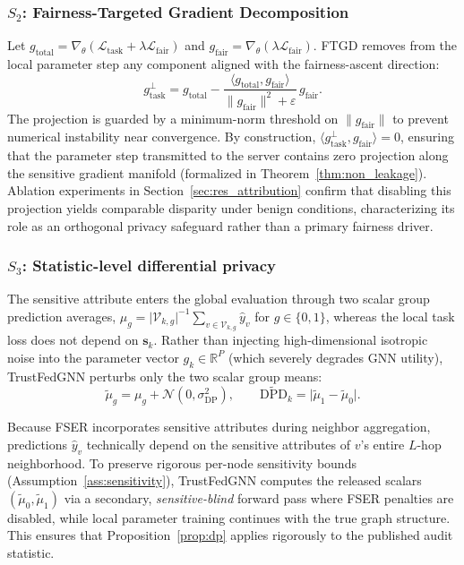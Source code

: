 \documentclass[preprint,12pt]{elsarticle}
\theoremstyle{plain}
\theoremstyle{definition}
\theoremstyle{remark}
\newcommand{\dpd}{\mathrm{DPD}}
\newcommand{\R}{\mathbb{R}}
\begin{document}
\subsubsection{\texorpdfstring{$S_2$:}{S2:} Fairness-Targeted Gradient Decomposition}
Let $g_{\mathrm{total}} = \nabla_\theta(\mathcal{L}_{\mathrm{task}} + \lambda \mathcal{L}_{\mathrm{fair}})$ and $g_{\mathrm{fair}} = \nabla_\theta(\lambda\mathcal{L}_{\mathrm{fair}})$. FTGD removes from the local parameter step any component aligned with the fairness-ascent direction:
\begin{equation}
g^{\perp}_{\mathrm{task}} = g_{\mathrm{total}} - \frac{\langle g_{\mathrm{total}}, g_{\mathrm{fair}}\rangle}{\lVert g_{\mathrm{fair}}\rVert^2 + \varepsilon}\, g_{\mathrm{fair}} .
\label{eq:ftgd}
\end{equation}
The projection is guarded by a minimum-norm threshold on $\lVert g_{\mathrm{fair}}\rVert$ to prevent numerical instability near convergence. By construction, $\langle g^{\perp}_{\mathrm{task}}, g_{\mathrm{fair}}\rangle = 0$, ensuring that the parameter step transmitted to the server contains zero projection along the sensitive gradient manifold (formalized in Theorem~\ref{thm:non_leakage}). Ablation experiments in Section~\ref{sec:res_attribution} confirm that disabling this projection yields comparable disparity under benign conditions, characterizing its role as an orthogonal privacy safeguard rather than a primary fairness driver.

\subsubsection{\texorpdfstring{$S_3$:}{S3:} Statistic-level differential privacy}
The sensitive attribute enters the global evaluation through two scalar group prediction averages, $\mu_g = \lvert\mathcal{V}_{k,g}\rvert^{-1}\sum_{v \in \mathcal{V}_{k,g}} \hat{y}_v$ for $g \in \{0, 1\}$, whereas the local task loss does not depend on $\bm{s}_k$. Rather than injecting high-dimensional isotropic noise into the parameter vector $g_k \in \R^P$ (which severely degrades GNN utility), TrustFedGNN perturbs only the two scalar group means:
\begin{equation}
\tilde{\mu}_g = \mu_g + \mathcal{N}(0, \sigma_{\mathrm{DP}}^2), \qquad
\widetilde{\dpd}_k = \lvert \tilde{\mu}_1 - \tilde{\mu}_0 \rvert .
\label{eq:dp}
\end{equation}

Because FSER incorporates sensitive attributes during neighbor aggregation, predictions $\hat{y}_v$ technically depend on the sensitive attributes of $v$'s entire $L$-hop neighborhood. To preserve rigorous per-node sensitivity bounds (Assumption~\ref{ass:sensitivity}), TrustFedGNN computes the released scalars $(\tilde{\mu}_0, \tilde{\mu}_1)$ via a secondary, \emph{sensitive-blind} forward pass where FSER penalties are disabled, while local parameter training continues with the true graph structure. This ensures that Proposition~\ref{prop:dp} applies rigorously to the published audit statistic.
\end{document}

